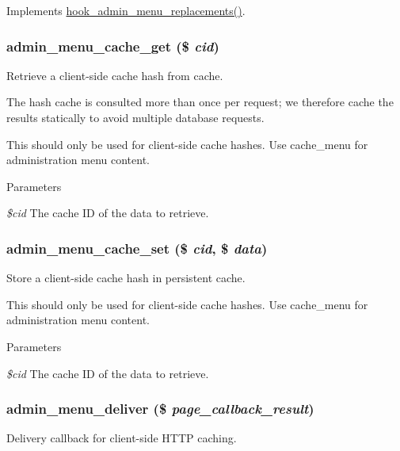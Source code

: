 \label{admin__menu_8module_a5620a2879f671baacea4a3c84283fc6a}
Implements \hyperlink{admin__menu_8api_8php_af3a48610c3fd1e828a053625d0184fa1}{hook\_\-admin\_\-menu\_\-replacements()}. \hypertarget{admin__menu_8module_a7d23ea7a1845b08897ec01ce76e178a0}{
\subsubsection[{admin\_\-menu\_\-cache\_\-get}]{\setlength{\rightskip}{0pt plus 5cm}admin\_\-menu\_\-cache\_\-get (\$ {\em cid})}}
\label{admin__menu_8module_a7d23ea7a1845b08897ec01ce76e178a0}
Retrieve a client-\/side cache hash from cache.

The hash cache is consulted more than once per request; we therefore cache the results statically to avoid multiple database requests.

This should only be used for client-\/side cache hashes. Use cache\_\-menu for administration menu content.


\begin{DoxyParams}{Parameters}
\item[{\em \$cid}]The cache ID of the data to retrieve. \end{DoxyParams}
\hypertarget{admin__menu_8module_a77b0c61055add647432ae94d0693414d}{
\subsubsection[{admin\_\-menu\_\-cache\_\-set}]{\setlength{\rightskip}{0pt plus 5cm}admin\_\-menu\_\-cache\_\-set (\$ {\em cid}, \/  \$ {\em data})}}
\label{admin__menu_8module_a77b0c61055add647432ae94d0693414d}
Store a client-\/side cache hash in persistent cache.

This should only be used for client-\/side cache hashes. Use cache\_\-menu for administration menu content.


\begin{DoxyParams}{Parameters}
\item[{\em \$cid}]The cache ID of the data to retrieve. \end{DoxyParams}
\hypertarget{admin__menu_8module_ab013e2c0ba08ba3bd0ea79bb9aa6518b}{
\subsubsection[{admin\_\-menu\_\-deliver}]{\setlength{\rightskip}{0pt plus 5cm}admin\_\-menu\_\-deliver (\$ {\em page\_\-callback\_\-result})}}
\label{admin__menu_8module_ab013e2c0ba08ba3bd0ea79bb9aa6518b}
Delivery callback for client-\/side HTTP caching.

